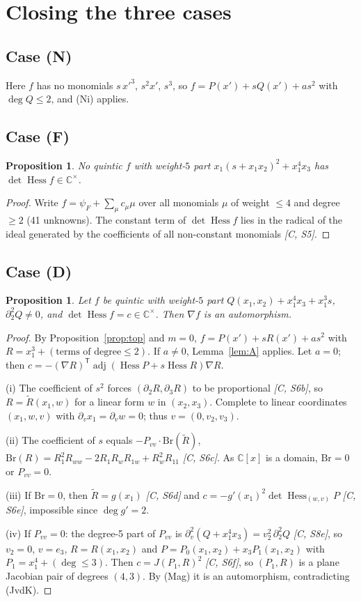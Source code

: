 \documentclass[11pt]{article}
\newtheorem{proposition}[theorem]{Proposition}
\theoremstyle{remark}
\newcommand{\C}{\mathbb{C}}
\newcommand{\Hess}{\operatorname{Hess}}
\newcommand{\adj}{\operatorname{adj}}
\begin{document}
\section{Closing the three cases}
\subsection{Case (N)} Here $f$ has no monomials $s\,x'^3$, $s^2x'$, $s^3$, so $f=P(x')+sQ(x')+as^2$ with $\deg Q\le2$, and (Ni) applies.

\subsection{Case (F)}
\begin{proposition}
No quintic $f$ with weight-$5$ part $x_1(s+x_1x_2)^2+x_1^4x_3$ has $\det\Hess f\in\C^\times$.
\end{proposition}
\begin{proof}
Write $f=\psi_F+\sum_\mu c_\mu\mu$ over all monomials $\mu$ of weight $\le4$ and degree $\ge2$ (41 unknowns). The constant term of $\det\Hess f$ lies in the radical of the ideal generated by the coefficients of all non-constant monomials \emph{[C, S5]}.
\end{proof}

\subsection{Case (D)}\label{sec:D}
\begin{proposition}
Let $f$ be quintic with weight-$5$ part $Q(x_1,x_2)+x_1^4x_3+x_1^3s$, $\partial_2^2Q\ne0$, and $\det\Hess f=c\in\C^\times$. Then $\nabla f$ is an automorphism.
\end{proposition}
\begin{proof}
By Proposition~\ref{prop:top} and $m=0$, $f=P(x')+sR(x')+as^2$ with $R=x_1^3+(\text{terms of degree}\le2)$. If $a\ne0$, Lemma~\ref{lem:A} applies. Let $a=0$; then $c=-(\nabla R)^{\mathsf T}\adj(\Hess P+s\Hess R)\nabla R$.

(i) The coefficient of $s^2$ forces $(\partial_2R,\partial_3R)$ to be proportional \emph{[C, S6b]}, so $R=\tilde R(x_1,w)$ for a linear form $w$ in $(x_2,x_3)$. Complete to linear coordinates $(x_1,w,v)$ with $\partial_v x_1=\partial_v w=0$; thus $v=(0,v_2,v_3)$.

(ii) The coefficient of $s$ equals $-P_{vv}\cdot\mathrm{Br}(\tilde R)$, $\mathrm{Br}(R)=R_1^2R_{ww}-2R_1R_wR_{1w}+R_w^2R_{11}$ \emph{[C, S6c]}. As $\C[x]$ is a domain, $\mathrm{Br}=0$ or $P_{vv}=0$.

(iii) If $\mathrm{Br}=0$, then $\tilde R=g(x_1)$ \emph{[C, S6d]} and $c=-g'(x_1)^2\det\Hess_{(w,v)}P$ \emph{[C, S6e]}, impossible since $\deg g'=2$.

(iv) If $P_{vv}=0$: the degree-5 part of $P_{vv}$ is $\partial_v^2(Q+x_1^4x_3)=v_2^2\,\partial_2^2Q$ \emph{[C, S8e]}, so $v_2=0$, $v=e_3$, $R=R(x_1,x_2)$ and $P=P_0(x_1,x_2)+x_3P_1(x_1,x_2)$ with $P_1=x_1^4+(\deg\le3)$. Then $c=J(P_1,R)^2$ \emph{[C, S6f]}, so $(P_1,R)$ is a plane Jacobian pair of degrees $(4,3)$. By (Mag) it is an automorphism, contradicting (JvdK).
\end{proof}
\end{document}
